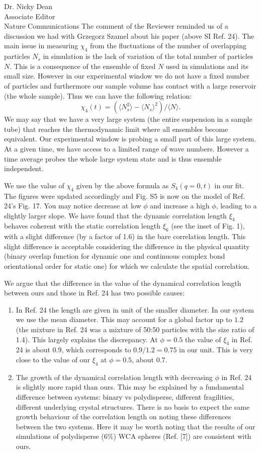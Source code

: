 \documentclass[a4paper, rebuttal, parskip=true, firsthead=false, fromemail=true, foldmarks=false]{scrlttr2}
\begin{document}
\begin{letter}{Dr. Nicky Dean\\
Associate Editor\\
Nature Communications}
The comment of the Reviewer reminded us of a discussion we had with Grzegorz Szamel about his paper (above SI Ref. 24). The main issue in measuring $\chi_4$ from the fluctuations of the number of overlapping particles $N_s$ in simulation is the lack of variation of the total number of particles $N$. This is a consequence of the ensemble of fixed $N$ used in simulations and its small size. However in our experimental window we do not have a fixed number of particles and furthermore our sample volume has contact with a large reservoir 
(the whole sample). Thus we can have the following relation:
\[
\chi_4(t) = (\langle N_s^2\rangle - \langle N_s\rangle^2) /  \langle N\rangle. 
\]
We may say that we have a very large system (the entire suspension in a sample tube) that reaches the thermodynamic limit where all ensembles become equivalent. Our experimental window is probing a small part of this large system. At a given time, we have access to a limited range of wave numbers. However a time average probes the whole large system state and is thus ensemble independent.

We use the value of $\chi_4$ given by the above formula as $S_4(q=0,t)$ in our fit. The figures were updated accordingly and Fig. S5 is now on the model of Ref. 24's Fig. 17. You may notice decrease at low $\phi$ and increase a high $\phi$, leading to a slightly larger slope. 
We have found that the dynamic correlation length $\xi_4$ behaves coherent with the static correlation length $\xi_6$ (see the inset of Fig. 1), 
with a slight difference (by a factor of 1.6) in the bare correlation length. This slight difference is acceptable considering the difference in the 
physical quantity (binary overlap function 
for dynamic one and continuous complex bond orientational order for static one) for which we calculate the spatial correlation.  

We argue that the difference in the value of the dynamical correlation length between ours and those in Ref. 24 has two possible causes:
\begin{enumerate}
\item In Ref. 24 the length are given in unit of the smaller diameter. In our system we use the mean diameter. This may account for a global factor up to $1.2$ (the mixture in Ref. 24 was a mixture of 50:50 particles with the size ratio of 1.4). This largely explains the discrepancy. At $\phi=0.5$ the value of $\xi_4$ in Ref. 24 is about 0.9, 
which corresponds to $0.9/1.2=0.75$ in our unit. This is very close to the value of our $\xi_4$ at $\phi=0.5$, about 0.7.   
\item The growth of the dynamical correlation length with decreasing $\phi$ in Ref. 24 is slightly more rapid than ours. 
This may be explained by a fundamental difference between systems: binary vs polydisperse, different fragilities, different underlying crystal structures. 
There is no basis to expect the same growth behaviour of the correlation length on noting these differences between the two systems. 
Here it may be worth noting that the results of our simulations of polydisperse ($6\%$) WCA spheres (Ref. [7]) are consistent with ours. 
\end{enumerate} 



\end{letter}
\end{document}
